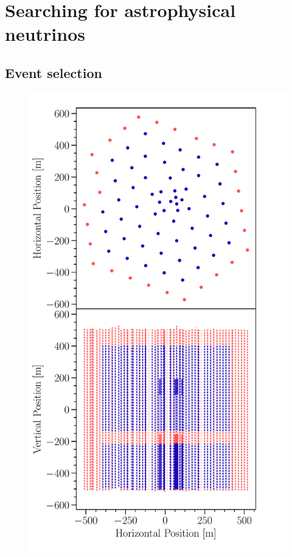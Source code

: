\chapter{Searching for astrophysical neutrinos}

\section{Event selection}

\begin{figure}
	\centering
	\includegraphics[width=\linewidth]{figures/hese_paper/veto_diagram_vertical}

\end{figure}
